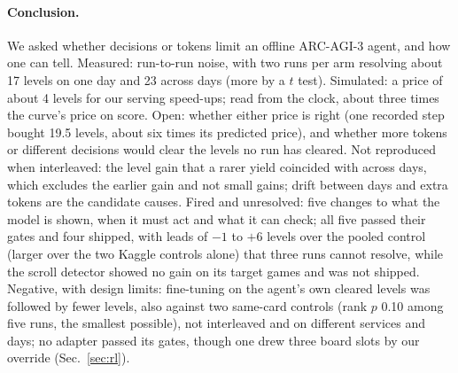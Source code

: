 \paragraph{Conclusion.}
We asked whether decisions or tokens limit an offline ARC-AGI-3 agent, and how one can tell.
Measured: run-to-run noise, with two runs per arm resolving about 17 levels on one day and 23 across days (more by a $t$ test). %
Simulated: a price of about 4 levels for our serving speed-ups; read from the clock, about three times the curve's price on score. %
Open: whether either price is right (one recorded step bought 19.5 levels, about six times its predicted price), and whether more tokens or different decisions would clear the levels no run has cleared. %
Not reproduced when interleaved: the level gain that a rarer yield coincided with across days, which excludes the earlier gain and not small gains; drift between days and extra tokens are the candidate causes. %
Fired and unresolved: five changes to what the model is shown, when it must act and what it can check; all five passed their gates and four shipped, with leads of $-1$ to $+6$ levels over the pooled control (larger over the two Kaggle controls alone) that three runs cannot resolve, while the scroll detector showed no gain on its target games and was not shipped. %
Negative, with design limits: fine-tuning on the agent's own cleared levels was followed by fewer levels, also against two same-card controls (rank $p$ 0.10 among five runs, the smallest possible), not interleaved and on different services and days; no adapter passed its gates, though one drew three board slots by our override (Sec.~\ref{sec:rl}). %
